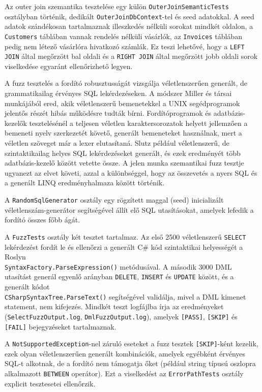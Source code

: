 Az outer join szemantika tesztelése egy külön \texttt{OuterJoinSemanticTests} osztályban történik, dedikált \texttt{OuterJoinDbContext}-tel és seed adatokkal. A seed adatok szándékosan tartalmaznak illeszkedés nélküli sorokat mindkét oldalon, a \texttt{Customers} táblában vannak rendelés nélküli vásárlók, az \texttt{Invoices} táblában pedig nem létező vásárlóra hivatkozó számlák. Ez teszi lehetővé, hogy a \texttt{LEFT JOIN} által megőrzött bal oldali és a \texttt{RIGHT JOIN} által megőrzött jobb oldali sorok viselkedése egyaránt ellenőrizhető legyen.


A fuzz tesztelés a fordító robusztusságát vizsgálja véletlenszerűen generált, de grammatikailag érvényes SQL lekérdezéseken. A módszer Miller és társai \cite{miller1990fuzz} munkájából ered, akik véletlenszerű bemenetekkel a UNIX segédprogramok jelentős részét hibás működésre tudták bírni. Fordítóprogramok és adatbázis-kezelők tesztelésénél a teljesen véletlen karaktersorozatok helyett jellemzően a bemeneti nyelv szerkezetét követő, generált bemeneteket használnak, mert a véletlen szöveget már a lexer elutasítaná. Slutz \cite{slutz1998rags} például véletlenszerű, de szintaktikailag helyes SQL lekérdezéseket generált, és ezek eredményét több adatbázis-kezelő között vetette össze. A jelen munka szemantikai fuzz tesztje ugyanezt az elvet követi, azzal a különbséggel, hogy az összevetés a nyers SQL és a generált LINQ eredményhalmaza között történik.

A \texttt{RandomSqlGenerator} osztály egy rögzített maggal (seed) inicializált véletlenszám-generátor segítségével állít elő SQL utasításokat, amelyek lefedik a fordító összes főbb ágát.

A \texttt{FuzzTests} osztály két tesztet tartalmaz. Az első 2500 véletlenszerű \texttt{SELECT} lekérdezést fordít le és ellenőrzi a generált C\# kód szintaktikai helyességét a Roslyn \\ \texttt{SyntaxFactory.ParseExpression()} metódusával. A második 3000 DML utasítást generál egyenlő arányban \texttt{DELETE}, \texttt{INSERT} és \texttt{UPDATE} között, és a generált kódot \\ \texttt{CSharpSyntaxTree.ParseText()} segítségével validálja, mivel a DML kimenet statement, nem kifejezés. Mindkét teszt logfájlba írja az eredményeket (\texttt{SelectFuzzOutput.log}, \texttt{DmlFuzzOutput.log}), amelyek \texttt{[PASS]}, \texttt{[SKIP]} és \texttt{[FAIL]} bejegyzéseket tartalmaznak.

A \texttt{NotSupportedException}-nel záruló eseteket a fuzz tesztek \texttt{[SKIP]}-ként kezelik, ezek olyan véletlenszerűen generált kombinációk, amelyek egyébként érvényes SQL-t alkotnak, de a fordító nem támogatja őket (például string típusú oszlopra alkalmazott \texttt{BETWEEN} operátor). Ezt a viselkedést az \texttt{ErrorPathTests} osztály explicit tesztesetei ellenőrzik.

